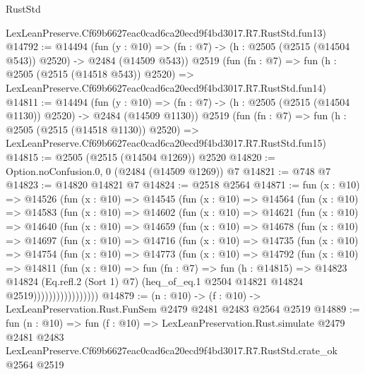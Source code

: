 \begin{lexlean}{RustStd}
\begin{coremodule}
    LexLeanPreserve.Cf69b6627eac0cad6ca20ecd9f4bd3017.R7.RustStd.fun13)
@14792 := @14494
    (fun (y : @10) => (fn : @7) -> (h : @2505 (@2515 (@14504 @543)) @2520) -> @2484 (@14509 @543))
    @2519
    (fun (fn : @7) =>
    fun (h : @2505 (@2515 (@14518 @543)) @2520) =>
    LexLeanPreserve.Cf69b6627eac0cad6ca20ecd9f4bd3017.R7.RustStd.fun14)
@14811 := @14494
    (fun (y : @10) => (fn : @7) -> (h : @2505 (@2515 (@14504 @1130)) @2520) -> @2484 (@14509 @1130))
    @2519
    (fun (fn : @7) =>
    fun (h : @2505 (@2515 (@14518 @1130)) @2520) =>
    LexLeanPreserve.Cf69b6627eac0cad6ca20ecd9f4bd3017.R7.RustStd.fun15)
@14815 := @2505 (@2515 (@14504 @1269)) @2520
@14820 := Option.noConfusion.{0, 0} (@2484 (@14509 @1269)) @7
@14821 := @748 @7
@14823 := @14820 @14821 @7
@14824 := @2518 @2564
@14871 := fun (x : @10) =>
  @14526
    (fun (x : @10) =>
    @14545
      (fun (x : @10) =>
      @14564
        (fun (x : @10) =>
        @14583
          (fun (x : @10) =>
          @14602
            (fun (x : @10) =>
            @14621
              (fun (x : @10) =>
              @14640
                (fun (x : @10) =>
                @14659
                  (fun (x : @10) =>
                  @14678
                    (fun (x : @10) =>
                    @14697
                      (fun (x : @10) =>
                      @14716
                        (fun (x : @10) =>
                        @14735
                          (fun (x : @10) =>
                          @14754
                            (fun (x : @10) =>
                            @14773
                              (fun (x : @10) =>
                              @14792
                                (fun (x : @10) =>
                                @14811
                                  (fun (x : @10) =>
                                  fun (fn : @7) =>
                                  fun (h : @14815) =>
                                  @14823
                                    @14824
                                    (Eq.refl.{2} (Sort 1) @7)
                                    (heq_of_eq.{1} @2504 @14821 @14824 @2519)))))))))))))))))
@14879 := (n : @10) -> (f : @10) -> LexLeanPreservation.Rust.FunSem @2479 @2481 @2483 @2564 @2519
@14889 := fun (n : @10) =>
  fun (f : @10) =>
  LexLeanPreservation.Rust.simulate
    @2479
    @2481
    @2483
    LexLeanPreserve.Cf69b6627eac0cad6ca20ecd9f4bd3017.R7.RustStd.crate_ok
    @2564
    @2519
\end{coremodule}
\end{lexlean}
